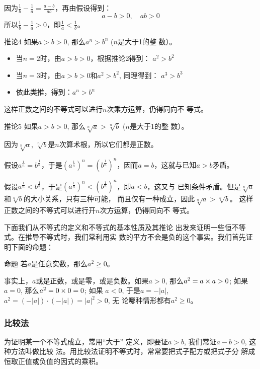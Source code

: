 因为$\frac{1}{b}-\frac{1}{a}=\frac{a-b}{ab}$，再由假设得到：
\[a-b>0,\quad ab>0\]
所以$\frac{1}{b}-\frac{1}{a}>0$，即$\frac{1}{a}<\frac{1}{b}$。

\begin{blk}{推论4}
    如果$a>b>0$, 那么$a^n>b^n$ ($n$是大于1的整
数）。
\end{blk}

\begin{itemize}
    \item 当$n=2$时，由$a>b>0$，根据推论2得到：
$a^2>b^2$
\item 当$n=3$时，由$a>b>0$和$a^2>b^2$, 同理得到：
$a^3>b^3$
\item 依此类推，得到：$a^n>b^n$
\end{itemize}
这样正数之间的不等式可以进行$n$次乘方运算，仍得同向不
等式。

\begin{blk}{推论5}
    如果$a>b>0$, 那么$\sqrt[n]{a}>\sqrt[n]{b}$ ($n$是大于1的整
数）。
\end{blk}

因为$\sqrt[n]{a}$, $\sqrt[n]{b}$是$n$次算术根，所以它们都是正数。

假设$a^{\tfrac{1}{n}}=b^{\tfrac{1}{n}}$，于是$\left(a^{\tfrac{1}{n}}\right)^n=\left(b^{\tfrac{1}{n}}\right)^n$，因而$a=b$，这就与已知$a>b$矛盾。

假设$a^{\tfrac{1}{n}}<b^{\tfrac{1}{n}}$，于是$\left(a^{\tfrac{1}{n}}\right)^n<\left(b^{\tfrac{1}{n}}\right)^n$，即$a<b$，这又与
已知条件矛盾。但是$\sqrt[n]{a}$和$\sqrt[n]{b}$的大小关系，只有三种可能，
而且仅有一种成立，因此$\sqrt[n]{a}>\sqrt[n]{b}$。
这样正数之间的不等式可以进行开$n$次方运算，仍得同向不
等式。

下面我们从不等式的定义和不等式的基本性质及其推论
出发来证明一些恒不等式。在推导不等式时，我们常利用实
数的平方不会是负的这个事实。我们首先证明下面的命题：

\begin{blk}{命题}
    若$a$是任意实数，那么$a^2\ge 0$。
\end{blk}

事实上，$a$或是正数，或是零，或是负数。如果$a>0$,
那么$a^2=a\times a>0$; 如果$a=0$, 那么$a^2=0\times0=0$; 如果
$a<0$, 于是$a=-|a|$, $a^2=(-|a|)\cdot (-|a|)=|a|^2>0$, 无
论哪种情形都有$a^2\ge 0$。

\subsubsection{比较法}

为证明某一个不等式成立，常用“大于”
定义，即要证$a>b$, 我们常证$a-b>0$, 这种方法叫做比较
法。用比较法证明不等式时，常常要把式子配方或把式子分
解成恒取正值或负值的因式的乘积。

